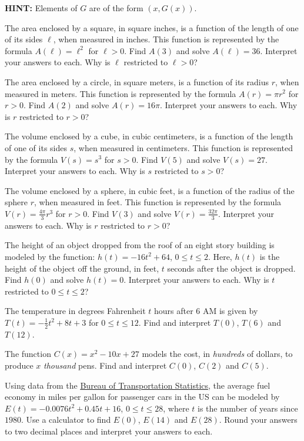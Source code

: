 \begin{tasks}[resume]
\textbf{HINT:}  Elements of $G$ are of the form $(x, G(x))$.

\task  The area enclosed by a square, in square inches,  is a function of the length of one of its sides $\ell$, when measured in inches.  This function is represented by the formula $A(\ell) = \ell^2$ for $\ell > 0$.  Find $A(3)$ and solve $A(\ell) = 36$.  Interpret your answers to each.  Why is $\ell$ restricted to $\ell > 0$?

\task  The area enclosed by a circle, in square meters, is a function of its radius $r$, when measured in meters.  This function is represented by the formula $A(r) = \pi r^2$ for $r > 0$.  Find $A(2)$ and solve $A(r) = 16\pi$.  Interpret your answers to each.  Why is $r$ restricted to $r > 0$?

\task  The volume  enclosed by a cube, in cubic centimeters, is a function of the length of one of its sides $s$, when measured in centimeters.   This function is represented by the formula $V(s) = s^3$ for $s > 0$.  Find $V(5)$ and solve $V(s) = 27$.  Interpret your answers to each.  Why is $s$ restricted to $s > 0$?

\task  The volume enclosed by a sphere, in cubic feet, is a function of the radius of the sphere $r$, when measured in feet. This function is represented by the formula  $V(r) =\frac{4\pi}{3} r^{3}$ for $r > 0$.  Find $V(3)$ and solve $V(r) = \frac{32\pi}{3}$.  Interpret your answers to each.  Why is $r$ restricted to $r > 0$?

\task  The height of an object dropped from the roof of an eight story building is modeled by the function:  $h(t) = -16t^2 + 64$, $0 \leq t \leq 2$. Here,  $h(t)$ is the height of the object off the ground, in feet, $t$ seconds after the object is dropped.  Find $h(0)$ and solve $h(t) = 0$.  Interpret your answers to each.  Why is $t$ restricted to $0 \leq t \leq 2$?

\task  The temperature in degrees Fahrenheit $t$ hours after 6 AM is given by $T(t) = -\frac{1}{2} t^2 + 8t+3$ for $0 \leq t \leq 12$. Find and interpret $T(0)$, $T(6)$ and $T(12)$.  

\task The function $C(x) = x^2-10x+27$  models the cost, in \textit{hundreds} of dollars, to produce $x$ \textit{thousand} pens.  Find and interpret $C(0)$, $C(2)$ and $C(5)$.

\task Using data from the  \href{http://www.bts.gov/publications/national_transportation_statistics/html/table_04_23.html}{\underline{Bureau of Transportation Statistics}}, the average fuel economy in miles per gallon for passenger cars in the US can be modeled by  $E(t) = -0.0076t^2+0.45t + 16$, $0 \leq t \leq 28$, where $t$ is the number of years since $1980$. Use a calculator to find $E(0)$, $E(14)$ and $E(28)$.  Round your answers to two decimal places and interpret your answers to each.


\end{tasks}
